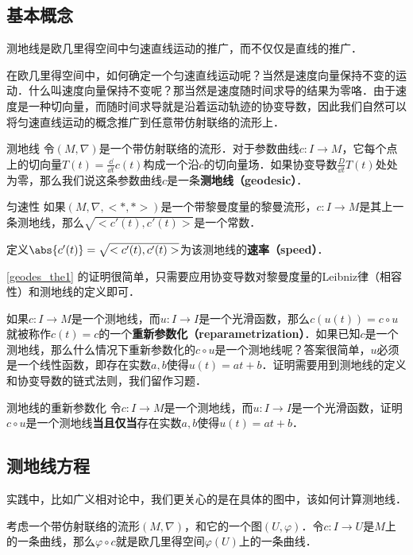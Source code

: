 

\subsection{基本概念}

测地线是欧几里得空间中匀速直线运动的推广，而不仅仅是直线的推广．

在欧几里得空间中，如何确定一个匀速直线运动呢？当然是速度向量保持不变的运动．什么叫速度向量保持不变呢？那当然是速度随时间求导的结果为零咯．由于速度是一种切向量，而随时间求导就是沿着运动轨迹的协变导数，因此我们自然可以将匀速直线运动的概念推广到任意带仿射联络的流形上．

\begin{definition}{测地线}
令$(M, \nabla)$是一个带仿射联络的流形．对于参数曲线$c:I\to M$，它每个点上的切向量$T(t)=\frac{\dd}{\dd t}c(t)$构成一个沿$c$的切向量场．如果协变导数$\frac{D}{\dd t}T(t)$处处为零，那么我们说这条参数曲线$c$是一条\textbf{测地线（geodesic）}．
\end{definition}

\begin{theorem}{匀速性}\label{geodes_the1}
如果$(M, \nabla, <*, *>)$是一个带黎曼度量的黎曼流形，$c:I\to M$是其上一条测地线，那么$\sqrt{<c'(t), c'(t)>}$是一个常数．

定义$\abs{c'(t)}=\sqrt{<c'(t), c'(t)>}$为该测地线的\textbf{速率（speed）}．
\end{theorem}

\autoref{geodes_the1} 的证明很简单，只需要应用协变导数对黎曼度量的Leibniz律（相容性）和测地线的定义即可．



如果$c:I\to M$是一个测地线，而$u:I\to I$是一个光滑函数，那么$c(u(t))=c\circ u$就被称作$c(t)=c$的一个\textbf{重新参数化（reparametrization）}．如果已知$c$是一个测地线，那么什么情况下重新参数化的$c\circ u$是一个测地线呢？答案很简单，$u$必须是一个线性函数，即存在实数$a, b$使得$u(t)=at+b$．证明需要用到测地线的定义和协变导数的链式法则，我们留作习题．

\begin{exercise}{测地线的重新参数化}
令$c:I\to M$是一个测地线，而$u:I\to I$是一个光滑函数，证明$c\circ u$是一个测地线\textbf{当且仅当}存在实数$a, b$使得$u(t)=at+b$．
\end{exercise}

\subsection{测地线方程}

实践中，比如广义相对论中，我们更关心的是在具体的图中，该如何计算测地线．

考虑一个带仿射联络的流形$(M, \nabla)$，和它的一个图$(U, \varphi)$．令$c:I\to U$是$M$上的一条曲线，那么$\varphi\circ c$就是欧几里得空间$\varphi(U)$上的一条曲线．



















